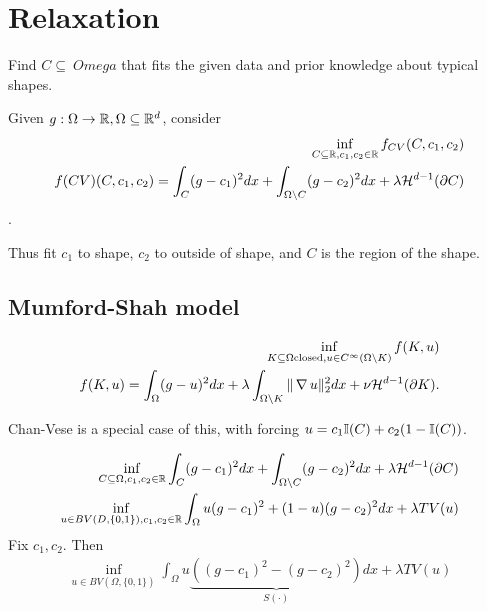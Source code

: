 \chapter{Relaxation}
\label{cha:relaxation}

\begin{exmp}[Segmentation]
  \label{defn:relaxation:1}
  Find $C \subseteq\ Omega$ that fits the given data and prior
  knowledge about typical shapes.
\end{exmp}

\begin{thm}
  \label{defn:relaxation:2}
  Given $g: \Omega \rightarrow \mathbb{R}, \Omega \subseteq \mathbb{R}^{d}$, consider
  \begin{align}
    \label{eq:110}
    \inf_{C \subseteq \mathbb{R}, c_{1}, c_{2} \in \mathbb{R}} f_{CV}(C, c_{1}, c_{2})
  \\
  f(CV)(C, c_{1}, c_{2}) = \int_{C}(g - c_{1})^{2} dx + \int_{\Omega
    \backslash C} (g -
  c_{2})^{2} dx + \lambda \mathcal{H}^{d-1}(\partial C)
  \end{align}
  .

  Thus fit $c_{1}$ to shape, $c_{2}$ to outside of shape, and $C$ is
  the region of the shape.
\end{thm}

\section{Mumford-Shah model}
\label{sec:mumford-shah-model}

\begin{align}
  \label{eq:111}
  \inf_{K \subseteq \Omega \text{closed}, u \in C^{\infty}(\Omega
    \backslash K)} f(K, u) \\
  f(K, u) = \int_{\Omega} (g - u)^{2} dx + \lambda \int_{\Omega
    \backslash K} \| \operatorname*{\nabla} u \|_{2}^{2} dx + \nu
  \mathcal{H}^{d-1}(\partial K).
\end{align} 

Chan-Vese is a special case of this, with forcing $u = c_{1} \I{C} +
c_{2}(1 - \I{C})$.


\begin{align}
  \label{eq:112}
  \inf_{C \subseteq \Omega, c_{1}, c_{2} \in \mathbb{R}} \int_{C} (g -
  c_{1})^{2} dx + \int_{\Omega \backslash C} (g - c_{2})^{2} dx +
  \lambda \mathcal{H}^{d-1}(\partial C) \\
  \inf_{u \in BV(D, \{ 0, 1 \}), c_{1}, c_{2} \in \mathbb{R}} \int_{\Omega} u
  (g - c_{1})^{2} + (1-u) (g - c_{2})^{2} dx + \lambda TV(u)
\end{align}  Fix $c_{1}, c_{2}$.  Then
\begin{align}
  \label{eq:113}
  \tag{$(C)$}
  \inf_{u \in BV(\Omega, \{ 0, 1 \})} \int_{\Omega} u \underbrace{((g - c_{1})^{2}
  - (g - c_{2})^{2})}_{S(\cdot)} dx + \lambda TV(u)
\end{align}

